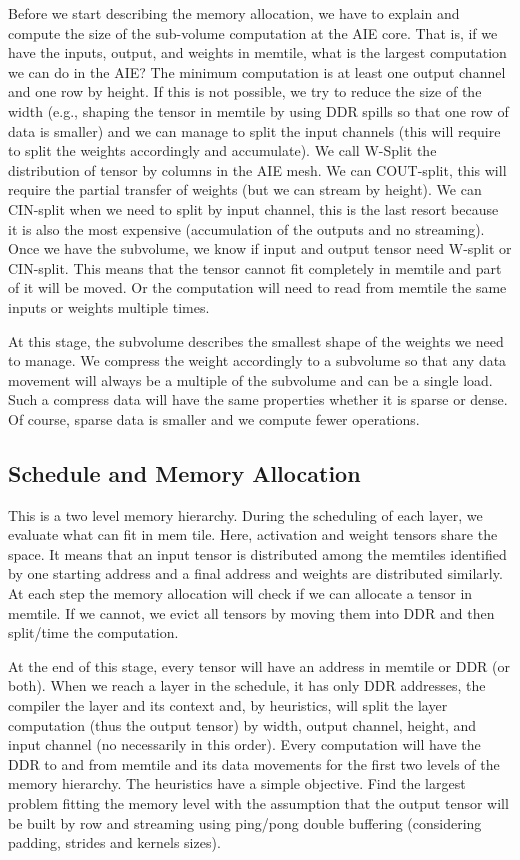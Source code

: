 \documentclass[conference]{IEEEtran}
\begin{document}

Before we start describing the memory allocation, we have to explain
and compute the size of the sub-volume computation at the AIE core.
That is, if we have the inputs, output, and weights in memtile, what
is the largest computation we can do in the AIE? The minimum
computation is at least one output channel and one row by height. If
this is not possible, we try to reduce the size of the width (e.g.,
shaping the tensor in memtile by using DDR spills so that one row of
data is smaller) and we can manage to split the input channels (this
will require to split the weights accordingly and accumulate). We call
W-Split the distribution of tensor by columns in the AIE mesh. We can
COUT-split, this will require the partial transfer of weights (but we
can stream by height).  We can CIN-split when we need to split by
input channel, this is the last resort because it is also the most
expensive (accumulation of the outputs and no streaming). Once we have
the subvolume, we know if input and output tensor need W-split or
CIN-split. This means that the tensor cannot fit completely in memtile
and part of it will be moved. Or the computation will need to read
from memtile the same inputs or weights multiple times.

At this stage, the subvolume describes the smallest shape of the
weights we need to manage. We compress the weight accordingly to 
a subvolume so that any data movement will always be a multiple of the
subvolume and can be a single load. Such a compress data will have the
same properties whether it is sparse or dense. Of course, sparse data is
smaller and we compute fewer operations.


\subsection{Schedule and Memory Allocation}
This is a two level memory hierarchy. During the scheduling of each
layer, we evaluate what can fit in mem tile. Here, activation and
weight tensors share the space. It means that an input tensor is
distributed among the memtiles identified by one starting address and
a final address and weights are distributed similarly. At each step
the memory allocation will check if we can allocate a tensor in
memtile. If we cannot, we evict all tensors by moving them into DDR
and then split/time the computation.


At the end of this stage, every tensor will have an address in memtile
or DDR (or both). When we reach a layer in the schedule, it has only
DDR addresses, the compiler the layer and its context and, by
heuristics, will split the layer computation (thus the output tensor)
by width, output channel, height, and input channel (no necessarily in
this order). Every computation will have the DDR to and from memtile
and its data movements for the first two levels of the memory
hierarchy. The heuristics have a simple objective. Find the largest
problem fitting the memory level with the assumption that the output
tensor will be built by row and streaming using ping/pong double
buffering (considering padding, strides and kernels sizes).
\end{document}
